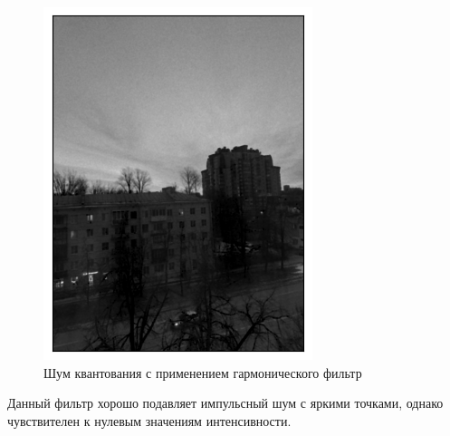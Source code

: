 \documentclass[a4paper,12pt]{article}
\begin{document}
\begin{figure}[H]
\begin{minipage}{0.49\textwidth}
        \centering \includegraphics[width=\textwidth]{results/lpf_pois_3.png}
        \caption{Шум квантования с применением гармонического фильтр}
    \end{minipage}
\end{figure}
\noindent
Данный фильтр хорошо подавляет импульсный шум с яркими точками, однако чувствителен к нулевым значениям интенсивности.
\end{document}
